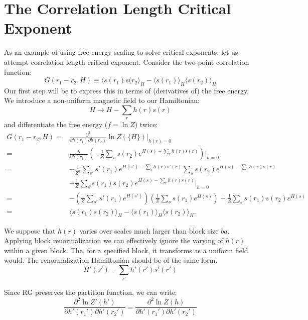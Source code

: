 \section{The Correlation Length Critical
  Exponent}\label{sec:rg-correlation-length}
As an example of using free energy scaling to solve critical
exponents, let us attempt correlation length critical
exponent. Consider the two-point correlation function:%
\begin{equation}
  G(r_1-r_2,H)\equiv\langle s(r_1)s(r_2\rangle_H - \langle s(r_1)\rangle_H\langle s(r_2)\rangle_H
\end{equation}
Our first step will be to express this in terms of (derivatives of)
the free energy. We introduce a non-uniform magnetic field to our
Hamiltonian:
\begin{equation}
  H \rightarrow H - \sum_r h(r) s(r)
\end{equation}
and differentiate the free energy ($f=\ln{Z}$) twice:
\begin{align}
  G(r_1-r_2,H)= &\frac{\partial^2}{\partial h(r_1) \partial h(r_2)} \ln{Z(\{H\})}\rvert_{h(r)=0} \\
  =& \frac{\partial}{\partial h(r_1)}\left(-\frac{1}{Z}\sum_s s(r_2) e^{H(s)-\sum_r h(r) s(r)}\right)\rvert_{h=0} \\
  =& -\frac{1}{Z^2}\sum_{s'} s'(r_1) e^{H(s')-\sum_r h(r) s'(r)} \sum_s s(r_2) e^{H(s)-\sum_r h(r) s(r)}\\
                & - \frac{1}{Z}\sum_s s(r_1)s(r_2) e^{H(s)-\sum_r h(r) s(r)}\rvert_{h=0}\\
  =&-\left(\frac{1}{Z}\sum_{s'}s'(r_1)e^{H(s')}\right)\left(\frac{1}{Z}\sum_{s}s(r_1)e^{H(s)}\right) + \frac{1}{Z}\sum_s s(r_1)s(r_2)e^{H(s)} \\
  =&\langle s(r_1)s(r_2)\rangle_H - \langle s(r_1)\rangle_H\langle s(r_2)\rangle_H.
\end{align}

We suppose that $h(r)$ varies over scales much larger than block size
$ba$. Applying block renormalization we can effectively ignore the
varying of $h(r)$ within a given block. The, for a specified block, it
transforms as a uniform field would. The renormalization Hamiltonian
should be of the same form.
\begin{equation}
  H'(s')-\sum_{r'}h'(r')s'(r')
\end{equation}

Since RG preserves the partition function, we can write:
\begin{equation}
  \frac{\partial^2 \ln Z'(h')}{\partial h'(r_1') \partial h'(r_2')}=\frac{\partial^2 \ln Z(h)}{\partial h'(r_1') \partial h'(r_2')}
\end{equation}

